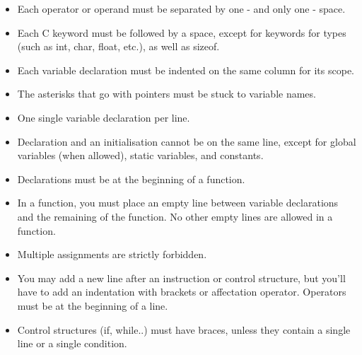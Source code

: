 \documentclass{42-en}
\begin{document}
\begin{itemize}
                \item Each operator or operand must be separated by one
                 - and only one - space.

                \item Each C keyword must be followed by a space, except for
                  keywords for types (such as int, char, float, etc.),
                  as well as sizeof.

                \item Each variable declaration must be indented on the same
                  column for its scope.

                \item The asterisks that go with pointers must be stuck to
                  variable names.

                \item One single variable declaration per line.

                \item Declaration and an initialisation cannot be
                  on the same line, except for global variables (when allowed),
                  static variables, and constants.

                \item Declarations must be at the beginning of a function.

                \item In a function, you must place an empty line between 
                    variable declarations and the remaining of the function.
                    No other empty lines are allowed in a function.

                \item Multiple assignments are strictly forbidden.

                \item You may add a new line after an instruction or
                  control structure, but you'll have to add an
                  indentation with brackets or affectation operator.
                  Operators must be at the beginning of a line.

                \item Control structures (if, while..) must have braces, unless they contain a single 
                    line or a single condition.

            \end{itemize}

            \newpage
\end{document}
